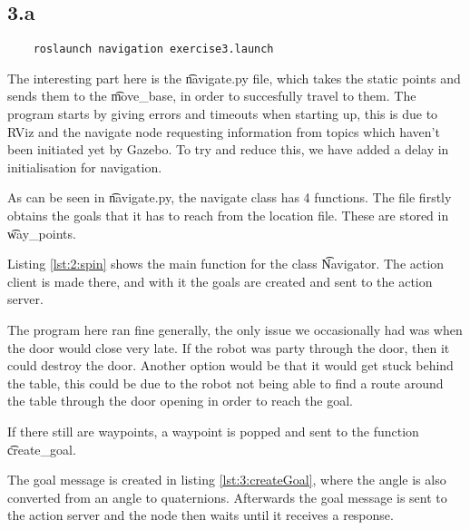 
\subsection*{3.a}
\begin{lstlisting}
	roslaunch navigation exercise3.launch
\end{lstlisting}

The interesting part here is the \t{navigate.py} file, which takes the static points and sends them to the \t{move_base}, in order to succesfully travel to them. The program starts by giving errors and timeouts when starting up, this is due to RViz and the navigate node requesting information from topics which haven't been initiated yet by Gazebo. To try and reduce this, we have added a delay in initialisation for navigation.

As can be seen in \t{navigate.py}, the navigate class has 4 functions. The file firstly obtains the goals that it has to reach from the location file. These are stored in \t{way_points}.




Listing \ref{lst:2:spin} shows the main function for the class \t{Navigator}. The action client is made there, and with it the goals are created and sent to the action server.

The program here ran fine generally, the only issue we occasionally had was when the door would close very late. If the robot was party through the door, then it could destroy the door. Another option would be that it would get stuck behind the table, this could be due to the robot not being able to find a route around the table through the door opening in order to reach the goal.

If there still are waypoints, a waypoint is popped and sent to the function \t{create_goal}.



The goal message is created in listing \ref{lst:3:createGoal}, where the angle is also converted from an angle to quaternions. Afterwards the goal message is sent to the action server and the node then waits until it receives a response. 



